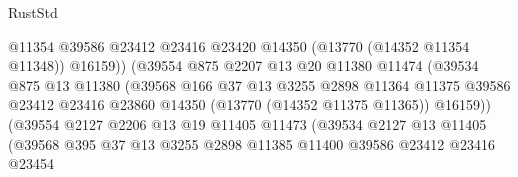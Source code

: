\begin{lexlean}{RustStd}
\begin{coremodule}
                                      @11354
                                      @39586
                                      @23412
                                      @23416
                                      @23420
                                      @14350
                                      (@13770 (@14352 @11354 @11348))
                                      @16159))
                                  (@39554
                                    @875
                                    @2207
                                    @13
                                    @20
                                    @11380
                                    @11474
                                    (@39534
                                      @875
                                      @13
                                      @11380
                                      (@39568
                                        @166
                                        @37
                                        @13
                                        @3255
                                        @2898
                                        @11364
                                        @11375
                                        @39586
                                        @23412
                                        @23416
                                        @23860
                                        @14350
                                        (@13770 (@14352 @11375 @11365))
                                        @16159))
                                    (@39554
                                      @2127
                                      @2206
                                      @13
                                      @19
                                      @11405
                                      @11473
                                      (@39534
                                        @2127
                                        @13
                                        @11405
                                        (@39568
                                          @395
                                          @37
                                          @13
                                          @3255
                                          @2898
                                          @11385
                                          @11400
                                          @39586
                                          @23412
                                          @23416
                                          @23454

\end{coremodule}
\end{lexlean}
